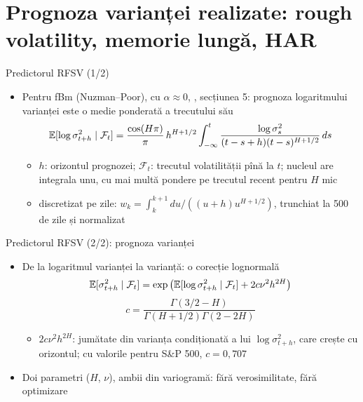 \section{Prognoza varianței realizate: rough volatility, memorie lungă, HAR}

\begin{frame}{Predictorul RFSV (1/2)}
\itemsize{\small}
\begin{itemize}
    \item Pentru fBm (Nuzman--Poor), cu $\alpha \approx 0$, , secțiunea 5: prognoza logaritmului varianței este o medie ponderată a trecutului său
    \[ \mathbb{E}[\log\sigma^2_{t+h} \mid \mathcal F_t] = \frac{\cos(H\pi)}{\pi}\,h^{H+1/2}\int_{-\infty}^t\frac{\log\sigma_s^2}{(t - s + h)(t - s)^{H+1/2}}\,ds \]
    \begin{itemize}
        \item $h$: orizontul prognozei; $\mathcal F_t$: trecutul volatilității pînă la $t$; nucleul are integrala unu, cu mai multă pondere pe trecutul recent pentru $H$ mic
        \item discretizat pe zile: $w_k = \int_k^{k+1}du/((u + h)u^{H+1/2})$, trunchiat la 500 de zile și normalizat
    \end{itemize}
\end{itemize}
\end{frame}

\begin{frame}{Predictorul RFSV (2/2): prognoza varianței}
\itemsize{\small}
\begin{itemize}
    \item De la logaritmul varianței la varianță: o corecție lognormală
    \[ \mathbb{E}[\sigma^2_{t+h} \mid \mathcal F_t] = \exp\big(\mathbb{E}[\log\sigma^2_{t+h} \mid \mathcal F_t] + 2c\nu^2h^{2H}\big) \]
    \[ c = \frac{\Gamma(3/2 - H)}{\Gamma(H + 1/2)\Gamma(2 - 2H)} \]
    \begin{itemize}
        \item $2c\nu^2h^{2H}$: jumătate din varianța condiționată a lui $\log\sigma^2_{t+h}$, care crește cu orizontul; cu valorile pentru S\&P 500, $c = 0{,}707$
    \end{itemize}
    \item Doi parametri ($H$, $\nu$), ambii din variogramă: fără verosimilitate, fără optimizare
\end{itemize}
\end{frame}

